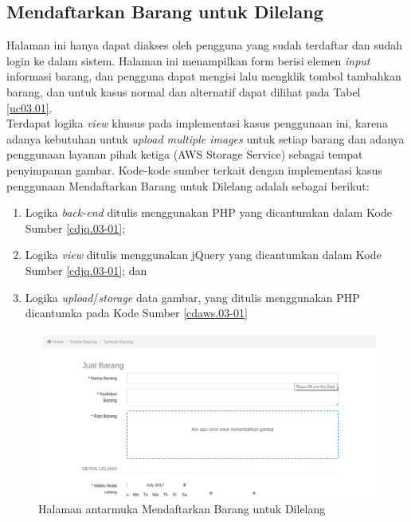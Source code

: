 \subsection{Mendaftarkan Barang untuk Dilelang}
\label{kasus-penggunaan-daftarbarang}
Halaman ini hanya dapat diakses oleh pengguna yang sudah terdaftar dan sudah login ke dalam sistem. Halaman ini menampilkan form berisi elemen \textit{input} informasi barang, dan pengguna dapat mengisi lalu mengklik tombol tambahkan barang, dan untuk kasus normal dan alternatif dapat dilihat pada Tabel \ref{uc03.01}.\\
\indent Terdapat logika \textit{view} khusus pada implementasi kasus penggunaan ini, karena adanya kebutuhan untuk \textit{upload multiple images} untuk setiap barang dan adanya penggunaan layanan pihak ketiga (AWS Storage Service) sebagai tempat penyimpanan gambar. Kode-kode sumber terkait dengan implementasi kasus penggunaan Mendaftarkan Barang untuk Dilelang adalah sebagai berikut:
	\begin{enumerate}
		\item Logika \textit{back-end} ditulis menggunakan PHP yang dicantumkan dalam Kode Sumber \ref{cdjq.03-01}; 
		\item Logika \textit{view} ditulis menggunakan jQuery yang dicantumkan dalam Kode Sumber \ref{cdjq.03-01}; dan
		\item Logika \textit{upload}/\textit{storage} data gambar, yang ditulis menggunakan PHP dicantumka pada Kode Sumber \ref{cdaws.03-01}
	\end{enumerate} 

  \begin{figure}[H]
    \centering
    \includegraphics[width=\textwidth]{images/bab4/ui/03-01.png}
    \caption{Halaman antarmuka Mendaftarkan Barang untuk Dilelang}
    \label{ui.01-01}
  \end{figure}

